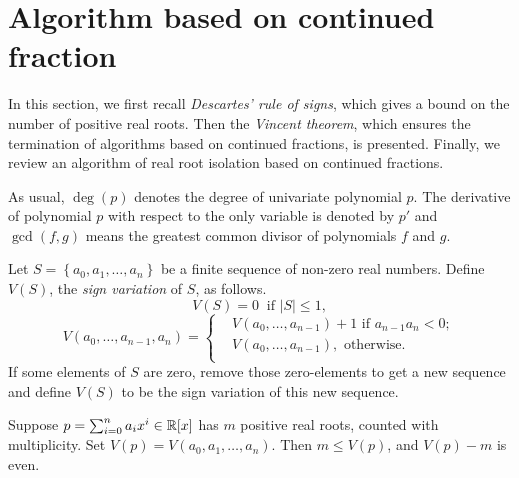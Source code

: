 
\section{Algorithm based on  continued fraction}
\label{sec:contalg}
In this section, we first recall {\em Descartes' rule of signs}, which gives a bound on the number of positive real roots. Then the {\em Vincent theorem}, which  ensures
the termination of algorithms based on  continued fractions, is presented. Finally, we review an algorithm of real root isolation based on  continued fractions.


As usual, $\deg(p)$ denotes the degree of univariate polynomial $p$. The derivative of polynomial $p$ with respect to the only variable is denoted by $p'$ and $\gcd(f,g)$ means the greatest common divisor of polynomials $f$ and $g$.

\begin{note}
Let $S=\left\{ a_0,a_1,\ldots,a_n \right\}$ be a finite sequence of non-zero real numbers. Define $V(S)$, the {\em sign variation} of $S$, as follows.
\[V(S)=0\ \text{ if } |S|\le1,\]
\[  V(a_0,\ldots,a_{n-1},a_n)=  \left\{\begin{aligned}
 &  V(a_0,\ldots,a_{n-1})+1 \text{ if }a_{n-1}a_n<0;\\
&V(a_0,\ldots,a_{n-1}), \text{ otherwise}.\\
	\end{aligned}
	\right.
\]
If some elements of $S$ are zero, remove those zero-elements to get a new sequence and define $V(S)$ to be the sign variation of this new sequence.

\end{note}





\begin{theorem} \label{thm:des}
  Suppose $p=\sum_{i=0}^na_ix^i\in{\mathbb R}[x]$ has $m$ positive real roots, counted with multiplicity. Set $V(p)=V(a_0,a_1,\ldots,a_n)$. Then $m\le V(p)$, and $V(p)-m$ is even.
\end{theorem}

